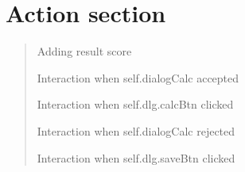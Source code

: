 \documentclass[letterpaper,10pt,english]{sphinxmanual}
\begin{document}
\section{Action section}
\label{\detokenize{dialog_interaction:action-section}}\begin{quote}

\begin{fulllineitems}
\label{\detokenize{dialog_interaction:addScoreItem}}
Adding result score

\end{fulllineitems}


\begin{fulllineitems}
\label{\detokenize{dialog_interaction:calculateDialogAccepted}}
Interaction when self.dialogCalc accepted

\end{fulllineitems}


\begin{fulllineitems}
\label{\detokenize{dialog_interaction:calculateClicked}}
Interaction when self.dlg.calcBtn clicked

\end{fulllineitems}


\begin{fulllineitems}
\label{\detokenize{dialog_interaction:calculateDialogRejected}}
Interaction when self.dialogCalc rejected

\end{fulllineitems}


\begin{fulllineitems}
\label{\detokenize{dialog_interaction:registerToProject}}
Interaction when self.dlg.saveBtn clicked

\end{fulllineitems}

\end{quote}
\end{document}
